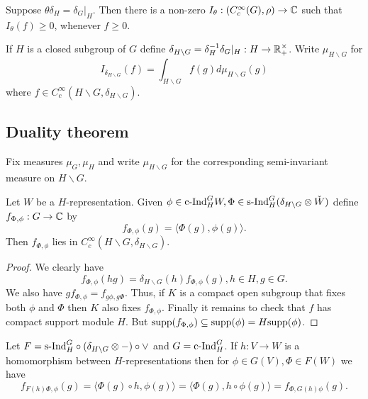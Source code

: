 \documentclass{memoir}
\begin{document}
\begin{corollary}
    Suppose $\theta\delta_H = \delta_G|_H$.
    Then there is a non-zero $I_\theta:(C_c^\infty(G),\rho)\to \mathbb{C}$ such that $I_\theta(f)\ge0$, whenever $f\ge0$.
\end{corollary}
\begin{definition}
    If $H$ is a closed subgroup of $G$ define $\delta_{H\backslash G} = \delta_H^{-1}\delta_G|_H:H\to \mathbb{R}_+^\times$.
    Write $\mu_{H\backslash G}$ for 
    \begin{equation}
        I_{\delta_{H\backslash G}}(f) = \int_{H\backslash G}f(g)d\mu_{H\backslash G}(g)
    \end{equation}
    where $f\in C_c^\infty(H\backslash G,\delta_{H\backslash G})$.
\end{definition}
\subsection{Duality theorem}
Fix measures $\mu_G,\mu_H$ and write $\mu_{H\backslash G}$ for the corresponding semi-invariant measure on $H\backslash G$.
\begin{proposition}
    Let $W$ be a $H$-representation.
    Given $\phi\in \text{c-Ind}_H^GW,\Phi\in\text{s-Ind}_H^G(\delta_{H\backslash G}\otimes \check W)$ define $f_{\Phi,\phi}:G\to \mathbb{C}$ by
    \begin{equation}
        f_{\Phi,\phi}(g) = \langle \Phi(g),\phi(g) \rangle.
    \end{equation}
    Then $f_{\Phi,\phi}$ lies in $C_c^\infty(H\backslash G,\delta_{H\backslash G})$.
\end{proposition}
\begin{proof}
    We clearly have
    \begin{equation}
        f_{\Phi,\phi}(hg) = \delta_{H\backslash G}(h)f_{\Phi,\phi}(g), h\in H, g\in G.
    \end{equation}
    We also have $gf_{\Phi,\phi} = f_{g\phi,g\Phi}$.
    Thus, if $K$ is a compact open subgroup that fixes both $\phi$ and $\Phi$ then $K$ also fixes $f_{\Phi,\phi}$.
    Finally it remains to check that $f$ has compact support module $H$.
    But $\text{supp}(f_{\Phi,\phi})\subseteq \text{supp}(\phi) = H\text{supp}(\phi)$.
\end{proof}
\begin{remark}
    Let $F = \text{s-Ind}_H^G\circ(\delta_{H\backslash G}\otimes -)\circ \vee$ and $G = \text{c-Ind}_H^G$.
    If $h:V\to W$ is a homomorphism between $H$-representations then for $\phi\in G(V), \Phi\in F(W)$ we have
    \begin{equation}
        f_{F(h)\Phi,\phi}(g) = \langle \Phi(g)\circ h, \phi(g) \rangle = \langle \Phi(g), h\circ\phi(g) \rangle = f_{\Phi,G(h)\phi}(g).
    \end{equation}
\end{remark}
\end{document}
